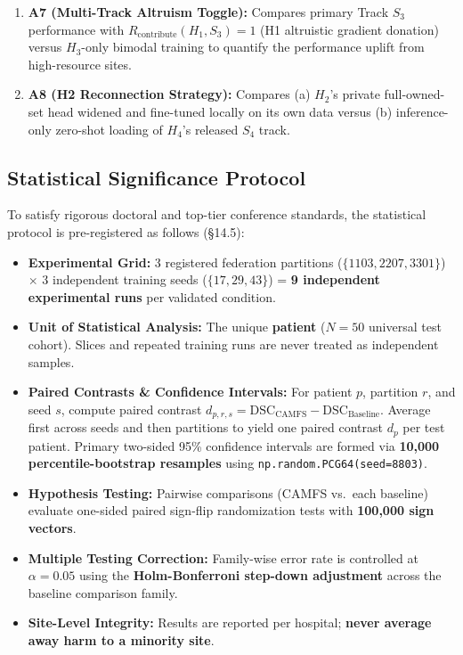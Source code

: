 \documentclass[10pt,a4paper]{article}
\begin{document}
\begin{enumerate}[itemsep=1.5pt, topsep=1.5pt]
    \item \textbf{A7 (Multi-Track Altruism Toggle):} Compares primary Track $S_3$ performance with $R_{\text{contribute}}(H_1, S_3) = 1$ (H1 altruistic gradient donation) versus $H_3$-only bimodal training to quantify the performance uplift from high-resource sites.
    \item \textbf{A8 (H2 Reconnection Strategy):} Compares (a) $H_2$'s private full-owned-set head widened and fine-tuned locally on its own data versus (b) inference-only zero-shot loading of $H_4$'s released $S_4$ track.
\end{enumerate}

\subsection{Statistical Significance Protocol}
\label{sec:stats_protocol}
To satisfy rigorous doctoral and top-tier conference standards, the statistical protocol is pre-registered as follows (\S14.5):
\begin{itemize}[itemsep=1.5pt, topsep=1.5pt]
    \item \textbf{Experimental Grid:} 3 registered federation partitions ($\{1103, 2207, 3301\}$) $\times$ 3 independent training seeds ($\{17, 29, 43\}$) = \textbf{9 independent experimental runs} per validated condition.
    \item \textbf{Unit of Statistical Analysis:} The unique \textbf{patient} ($N = 50$ universal test cohort). Slices and repeated training runs are never treated as independent samples.
    \item \textbf{Paired Contrasts \& Confidence Intervals:} For patient $p$, partition $r$, and seed $s$, compute paired contrast $d_{p,r,s} = \text{DSC}_{\text{CAMFS}} - \text{DSC}_{\text{Baseline}}$. Average first across seeds and then partitions to yield one paired contrast $d_p$ per test patient. Primary two-sided 95\% confidence intervals are formed via \textbf{10,000 percentile-bootstrap resamples} using \texttt{np.random.PCG64(seed=8803)}.
    \item \textbf{Hypothesis Testing:} Pairwise comparisons (CAMFS vs.\ each baseline) evaluate one-sided paired sign-flip randomization tests with \textbf{100,000 sign vectors}.
    \item \textbf{Multiple Testing Correction:} Family-wise error rate is controlled at $\alpha = 0.05$ using the \textbf{Holm-Bonferroni step-down adjustment} across the baseline comparison family.
    \item \textbf{Site-Level Integrity:} Results are reported per hospital; \textbf{never average away harm to a minority site}.
\end{itemize}
\end{document}
